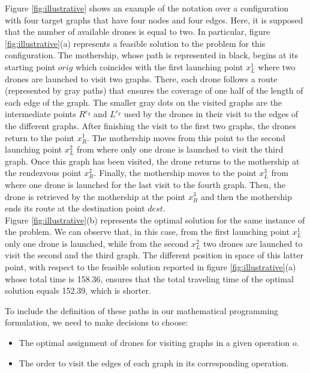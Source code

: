 \documentclass[10pt,a4paper]{elsarticle}
\newcommand{\EN}[1]{{\color{black}#1}}
\begin{document}
\noindent
Figure \ref{fig:illustrative} shows an example of the notation over a configuration with four target graphs that have four nodes and four edges. Here, it is supposed that the number of available drones is equal to two.  
In particular, figure \ref{fig:illustrative}(a) represents a feasible solution \EN{to} the problem for this configuration.
The mothership, whose path is represented in black, begins at its starting point $orig$ which coincides with the first launching point $x_L^1$ where two drones are launched to visit two graphs. There, each drone follows a route (represented by gray paths) that ensures the coverage of one half of the length of each edge of the graph. The smaller gray dots on the visited graphs are the intermediate points $R^{e_g}$ and $L^{e_g}$ used by the drones in their visit to the edges of the different graphs. After finishing the visit \EN{to} the first two graphs, the drones return to the point $x_R^1$. The mothership moves from this point to the second launching point $x_L^2$ from where only one drone is launched to visit the third graph. Once this graph \EN{has been} visited, the drone returns to the mothership at the rendezvous point $x_R^2$. Finally, the mothership moves to the point $x_L^3$ from where one drone is launched for the last visit to the fourth graph. Then, the drone is retrieved by the mothership at the point $x_R^3$ and then the mothership ends its route at the destination point $dest$.\\
Figure \ref{fig:illustrative}(b) represents the optimal solution for the same instance of the problem. We can observe that, in this case, from the first launching point $x_L^1$ only one drone is launched, while from the second $x_L^2$ two drones are launched to visit the second and the third graph. The different position in space of this latter point, with respect to the feasible solution reported in figure \ref{fig:illustrative}(a) whose total time is 158.36, ensures that the total traveling time of the optimal solution equals 152.39, which is shorter.



\noindent
To include the definition of these paths in our mathematical programming formulation, we need to make decisions to choose:
\begin{itemize}
\item The optimal assignment of drones for visiting graphs in a given operation $o$.
\item The order to visit the edges of each graph in its corresponding operation.
\end{itemize}
\end{document}
